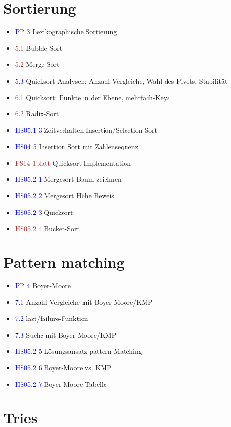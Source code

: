 \documentclass[a4paper,12pt]{article}
\newcommand{\ub}[1]{\textcolor{blue}{#1}}
\newcommand{\ubc}[1]{\textcolor{brown}{#1}}
\begin{document}
\section{Sortierung}

\begin{itemize}
  \item \ub{PP 3} Lexikographische Sortierung
  \item \ubc{5.1} Bubble-Sort
  \item \ubc{5.2} Merge-Sort
  \item \ub{5.3} Quicksort-Analysen: Anzahl Vergleiche, Wahl des Pivots, Stabilität
  \item \ubc{6.1} Quicksort: Punkte in der Ebene, mehrfach-Keys
  \item \ubc{6.2} Radix-Sort
  \item \ub{HS05.1 3} Zeitverhalten Insertion/Selection Sort
  \item \ub{HS04 5} Insertion Sort mit Zahlensequenz
  \item \ubc{FS14 1blatt} Quicksort-Implementation
  \item \ub{HS05.2 1} Mergesort-Baum zeichnen
  \item \ub{HS05.2 2} Mergesort Höhe Beweis
  \item \ub{HS05.2 3} Quicksort
  \item \ubc{HS05.2 4} Bucket-Sort
\end{itemize}

\section{Pattern matching}

\begin{itemize}
  \item \ub{PP 4} Boyer-Moore
  \item \ub{7.1} Anzahl Vergleiche mit Boyer-Moore/KMP 
  \item \ub{7.2} last/failure-Funktion
  \item \ub{7.3} Suche mit Boyer-Moore/KMP
  \item \ub{HS05.2 5} Lösungsansatz pattern-Matching
  \item \ub{HS05.2 6} Boyer-Moore vs. KMP
  \item \ub{HS05.2 7} Boyer-Moore Tabelle
\end{itemize}

\section{Tries}
\end{document}
